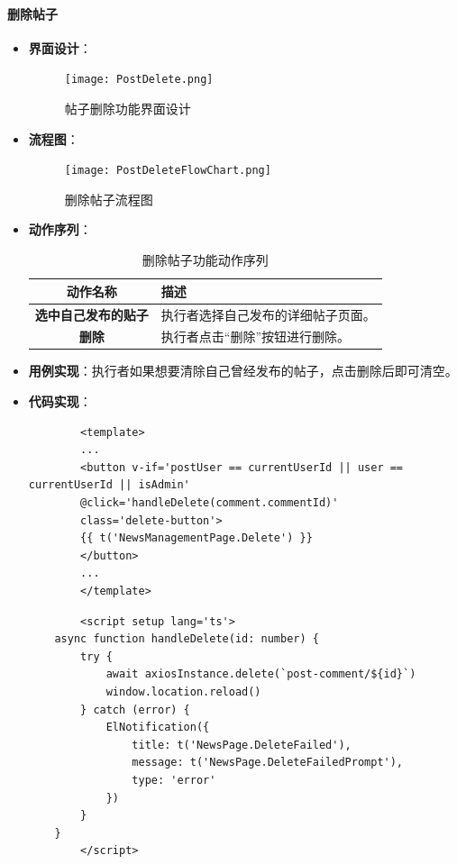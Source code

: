 \paragraph{删除帖子}
\begin{itemize}
	\item \textbf{界面设计}：
	
	\begin{figure}[H]
		\centering
		\texttt{[image: PostDelete.png]}
		\caption{帖子删除功能界面设计}
		\label{fig:post-comment-report.png}
	\end{figure}
	
	\item \textbf{流程图}：
	\begin{figure}[H]
		\centering
		\texttt{[image: PostDeleteFlowChart.png]}
		\caption{删除帖子流程图}
		\label{PostDeleteFlowChart}
	\end{figure}
	\item \textbf{动作序列}：
	\begin{table}[H]
		\centering
		\caption{删除帖子功能动作序列}
		\renewcommand\arraystretch{1.5}
		\begin{tabular}{|c|>{\raggedright\arraybackslash}p{10cm}|}
			\hline
			\textbf{动作名称} & \textbf{描述} \\ \hline
			\textbf{选中自己发布的贴子} & 执行者选择自己发布的详细帖子页面。 \\ \hline
			\textbf{删除} & 执行者点击“删除”按钮进行删除。 \\ \hline
		\end{tabular}
	\end{table}
	\item \textbf{用例实现}：执行者如果想要清除自己曾经发布的帖子，点击删除后即可清空。
	
	\item \textbf{代码实现}：
	\begin{verbatim}
		<template>
		...
		<button v-if='postUser == currentUserId || user == currentUserId || isAdmin'
		@click='handleDelete(comment.commentId)'
		class='delete-button'>
		{{ t('NewsManagementPage.Delete') }}
		</button>
		...
		</template>
	\end{verbatim}
	
	\begin{verbatim}
		<script setup lang='ts'>
	async function handleDelete(id: number) {
		try {
			await axiosInstance.delete(`post-comment/${id}`)
			window.location.reload()
		} catch (error) {
			ElNotification({
				title: t('NewsPage.DeleteFailed'),
				message: t('NewsPage.DeleteFailedPrompt'),
				type: 'error'
			})
		}
	}
		</script>
	\end{verbatim}
	
\end{itemize}

